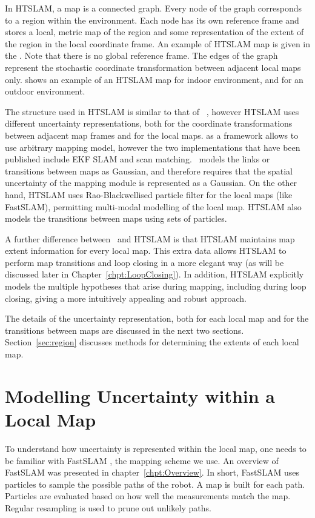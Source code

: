 In HTSLAM, a map is a connected graph. Every node of the graph
corresponds to a region within the environment. Each node has its own
reference frame and stores a local, metric map of the region and some
representation of the extent of the region in the local coordinate
frame. An example of HTSLAM map is given in the
. Note that there is no global reference
frame. The edges of the graph represent the stochastic coordinate
transformation between adjacent local maps
only.  shows an example of an
HTSLAM map for indoor environment, and
 for an outdoor environment.

The structure used in HTSLAM is similar to that of \Atlas\ 
\cite{bosse02atlas}, however HTSLAM uses different uncertainty
representations, both for the coordinate transformations between
adjacent map frames and for the local maps. 
\Atlas as a framework allows to use arbitrary mapping model, however the two
implementations that have been published include EKF SLAM and scan matching.
\Atlas\ models the links or transitions between maps as Gaussian, and therefore
requires that the spatial uncertainty of the mapping module is represented as a Gaussian.
On the other hand, HTSLAM uses Rao-Blackwellised particle filter for the local maps (like FastSLAM), 
permitting multi-modal modelling of the local map. HTSLAM also models the transitions 
between maps using sets of particles.

A further difference between \Atlas\ and HTSLAM is that HTSLAM
maintains map extent information for every local map. This extra data
allows HTSLAM to perform map transitions and loop closing in a more
elegant way (as will be discussed later in
Chapter~\ref{chpt:LoopClosing}). In addition, HTSLAM explicitly
models the multiple hypotheses that arise during mapping, including
during loop closing, giving a more intuitively appealing and robust
approach.

The details of the uncertainty representation, both for each local map
and for the transitions between maps are discussed in the next two
sections.  Section~\ref{sec:region} discusses methods for
determining the extents of each local map.

\section{Modelling Uncertainty within a Local Map}
\label{sec:local_map}

To understand how uncertainty is represented within the local map, one
needs to be familiar with FastSLAM \cite{Montemerlo02d}, the mapping
scheme we use. An overview of FastSLAM was presented in
chapter~\ref{chpt:Overview}. In short, FastSLAM uses particles to
sample the possible paths of the robot. A map is built for each
path. Particles are evaluated based on how well the measurements match
the map.  Regular resampling is used to prune out unlikely paths.

